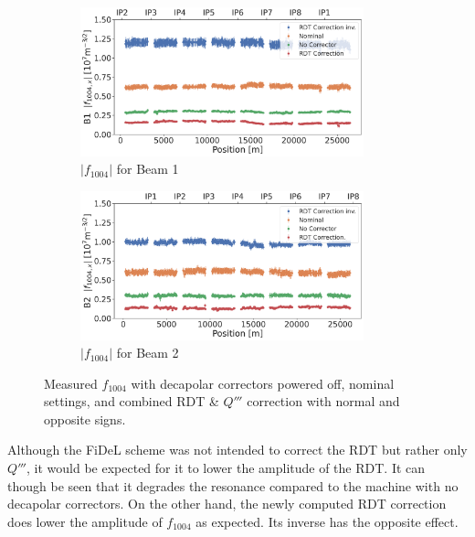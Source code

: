 \begin{figure}[!h]
    \centering
    \begin{subfigure}{1\textwidth}
        \includegraphics[width=0.9\textwidth]{./images/f1004/f1004x_corrections_B1.pdf}
        \caption{$|f_{1004}|$ for Beam 1}
        \vspace{0.5cm}
    \end{subfigure}
    \begin{subfigure}{1\textwidth}
        \includegraphics[width=0.9\textwidth]{./images/f1004/f1004x_corrections_B2.pdf}
        \caption{$|f_{1004}|$ for Beam 2}
    \end{subfigure}
    \caption{Measured $f_{1004}$ with decapolar correctors powered off, nominal settings, and
    combined RDT \& $Q'''$ correction with normal and opposite signs.}
    \label{fig:decapoles:rdts:f1004_correction_B2}
\end{figure}


Although the FiDeL scheme was not intended to correct the RDT but rather only $Q'''$, it would be 
expected for it to lower the amplitude of the RDT. It can though be seen that it degrades the
resonance compared to the machine with no decapolar correctors. On the other hand, the newly
computed RDT correction does lower the amplitude of $f_{1004}$ as expected.  Its inverse has the
opposite effect.

